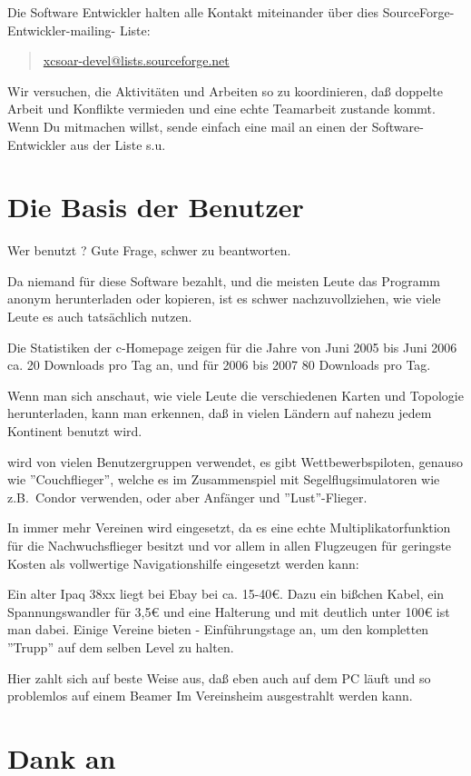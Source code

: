 Die Software Entwickler halten alle Kontakt miteinander über dies SourceForge-Entwickler-mailing- Liste:
\begin{quote}
\url{xcsoar-devel@lists.sourceforge.net}
\end{quote}
Wir versuchen, die Aktivitäten und Arbeiten so zu koordinieren, daß doppelte Arbeit und Konflikte vermieden 
und eine echte Teamarbeit zustande kommt.
Wenn Du mitmachen willst, sende einfach eine mail an einen der Software-Entwickler aus der Liste s.u.

\section{Die Basis der Benutzer}

Wer benutzt \xc? Gute Frage, schwer zu beantworten. 

Da niemand für diese Software bezahlt, und die meisten Leute das Programm 
anonym herunterladen oder kopieren, ist es schwer nachzuvollziehen,  wie viele Leute es auch tatsächlich nutzen.

Die Statistiken der c-Homepage zeigen für die Jahre von Juni 2005 bis Juni 2006 ca. 20 Downloads pro Tag an, und für 2006 bis 2007
80 Downloads pro Tag.

Wenn man sich anschaut, wie viele Leute die verschiedenen Karten und Topologie  herunterladen, kann man erkennen, daß
\xc in vielen Ländern auf nahezu jedem Kontinent benutzt wird.

\xc wird von vielen Benutzergruppen verwendet, es gibt Wettbewerbspiloten, genauso wie ''Couchflieger'',
welche es im Zusammenspiel mit Segelflugsimulatoren wie z.B.\ Condor verwenden, oder aber Anfänger und ''Lust''-Flieger.

In immer mehr Vereinen wird \xc eingesetzt, da es eine echte Multiplikatorfunktion für die Nachwuchsflieger besitzt  und vor allem
in allen Flugzeugen für geringste Kosten als vollwertige Navigationshilfe eingesetzt werden kann:


Ein alter Ipaq 38xx liegt bei Ebay bei ca. 15-40\euro{}. Dazu ein bißchen Kabel, ein Spannungswandler für 3,5\euro{} und eine Halterung 
und mit deutlich unter 100\euro{} ist man dabei.  
Einige Vereine bieten \xc - Einführungstage an, um den kompletten ''Trupp'' auf dem selben Level zu halten.

Hier zahlt sich auf beste Weise aus, daß \xc eben auch auf dem PC läuft und so problemlos auf einem Beamer Im Vereinsheim 
ausgestrahlt werden kann.

\section{Dank an}\label{sec:credits}

